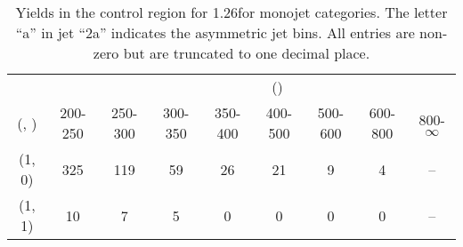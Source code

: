 \begin{table}[h!]
\tiny
\centering
\caption{Yields in the \mmj control region for 1.26\ifb for monojet categories. The letter ``a'' in jet \eg ``2a''  indicates the asymmetric jet bins. All entries are non-zero but are truncated to one decimal place.\label{tab:yieldssep_mumu_data_mono}}
\begin{tabular}
{ccccccccc}
	\hline\hline
&	& \multicolumn{8}{c}{\scalht (\gev)} \\ 
	 (\njet,  \nb) & 200-250 & 250-300 & 300-350 & 350-400 & 400-500 & 500-600 & 600-800 & 800-$\infty$ \\ [0.8ex] 
\hline
	(1, 0) & 325 & 119 & 59 & 26 & 21 & 9 & 4 & -- \\[0.5ex] 
	(1, 1) & 10 & 7 & 5 & 0 & 0 & 0 & 0 & -- \\[0.5ex] 
	\hline
	\hline
\end{tabular}
\end{table}

